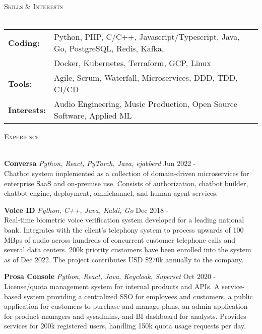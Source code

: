 \documentclass[a4paper]{article}
\newcommand{\lineunder} {
    \vspace*{-8pt} \\
    \hspace*{-18pt} \hrulefill \\
}
\newcommand{\header} [1] {
    {\hspace*{-18pt}\vspace*{6pt} \textsc{#1}}
    \vspace*{-6pt} \lineunder
}
\begin{document}
\header{Skills \& Interests}
\vspace{2mm}
\hspace{-4mm}
\begin{tabular}{ l l }
\textbf{Coding:} & Python, PHP, C/C++, Javascript/Typescript, Java, Go,
PostgreSQL, Redis, Kafka,\\
\vspace{1mm}
                 & Docker, Kubernetes, Terraform, GCP, Linux\\

\textbf{Tools}:
\vspace{1mm}
& Agile, Scrum, Waterfall, Microservices, DDD, TDD, CI/CD \\

\textbf{Interests:}
\vspace{1mm}
& Audio Engineering, Music Production, Open Source Software, Applied ML\\

\end{tabular}
\vspace{2mm}

\header{Experience}
\vspace{1mm}

{\textbf{Conversa}} {\sl Python, React, PyTorch, Java, ejabberd} \hfill Jun 2022 -\\
Chatbot system implemented as a collection of domain-driven microservices for
enterprise SaaS and on-premise use. Consists of authorization, chatbot builder,
chatbot engine, deployment, omnichannel, and human agent services.\\
\vspace*{2mm}

{\textbf{Voice ID}} {\sl Python, C++, Java, Kaldi, Go} \hfill Dec 2018 -\\
Real-time biometric voice verification system developed for a leading national bank.
Integrates with the client's telephony system to process upwards of 100 MBps of
audio across hundreds of concurrent customer telephone calls and several data
centers. 200k priority customers have been enrolled into the system as of Dec
2022. The project contributes USD \$270k annually to the company.
\vspace*{2mm}

{\textbf{Prosa Console}} {\sl Python, React, Java, Keycloak, Superset} \hfill
Oct 2020 -\\
License/quota management system for internal products and APIs.
A service-based system providing a centralized SSO for employees and customers,
a public application for customers to purchase and manage plans, an admin
application for product managers and sysadmins, and BI dashboard for analysts.
Provides services for 200k registered users, handling 150k quota usage requests
per day.
\vspace*{2mm}
\end{document}
